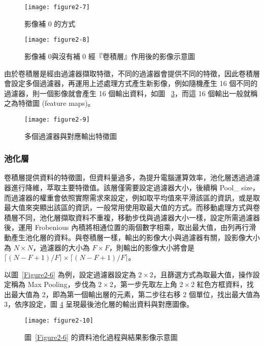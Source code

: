 \documentclass[12pt, a4paper]{article} 				%
\begin{document}
\begin{figure}[!ht]
\begin{center}
\texttt{[image: figure2-7]}
\caption{影像補 0 的方式}\label{Figure2-7}
\end{center}
\end{figure}

\begin{figure}[!ht]
\begin{center}
\texttt{[image: figure2-8]}
\caption{影像補 0與沒有補 0 經『卷積層』作用後的影像示意圖}\label{Figure2-8}
\end{center}
\end{figure}

由於卷積層是經由過濾器擷取特徵，不同的過濾器會提供不同的特徵，因此卷積層會設定多個過濾器，再運用上述處理方式產生新影像，例如隨機產生 16 個不同的過濾器，則一個影像就會產生 16 個輸出資料，如圖 ~\ref{Figure2-9}，而這 16 個輸出一般就稱之為特徵圖 (feature maps)。

\begin{figure}[!ht]
\begin{center}
\texttt{[image: figure2-9]}
\caption{多個過濾器與對應輸出特徵圖}\label{Figure2-9}
\end{center}
\end{figure}

\subsubsection{池化層}
卷積層提供資料的特徵圖，但資料量過多，為提升電腦運算效率，池化層透過過濾器進行降維，萃取主要特徵值。該層僅需要設定過濾器大小，後續稱 Pool\_ size，而過濾器的權重會依照實際需求來設定，例如取平均值來平滑該區的資訊，或是取最大值來突顯出該區的資訊，一般常用使用取最大值的方式。而移動處理方式與卷積層不同，池化層擷取資料不重複，移動步伐與過濾器大小一樣，設定所需過濾器後，運用 Frobenious 內積將相通位置的兩個數字相乘，取出最大值，由列再行滑動產生池化層的資料。與卷積層一樣，輸出的影像大小與過濾器有關，設影像大小為 $N\times N$，過濾器的大小為 $F\times F$，則輸出的影像大小將會是  $\lceil (N-F+1)/F\rceil \times \lceil (N-F+1)/F\rceil $。

以圖~\ref{Figure2-6} 為例，設定過濾器設定為 $2\times 2$，且篩選方式為取最大值，操作設定稱為 Max Pooling，步伐為 $2\times 2$，第一步先取左上角 $2\times 2$ 紅色方框資料，找出最大值為 2，即為第一個輸出層的元素，第二步往右移 2 個單位，找出最大值為 3，依序設定，圖 \ref{Figure2-10} 呈現最後池化層的輸出資料與對應圖像。

\begin{figure}[!ht]
\begin{center}
\texttt{[image: figure2-10]}
\caption{圖~\ref{Figure2-6} 的資料池化過程與結果影像示意圖}\label{Figure2-10}
\end{center}
\end{figure}
\end{document}
